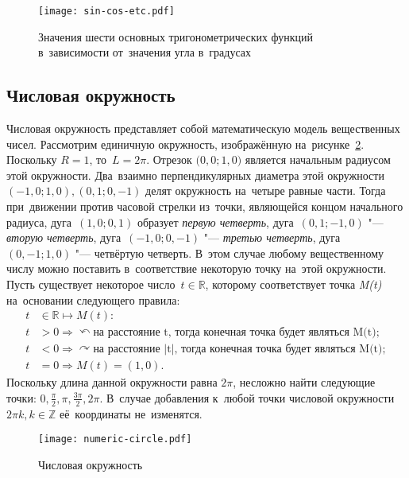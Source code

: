 \documentclass[]{scrartcl}
\begin{document}
\begin{figure}[ht]
	\centering %
	\texttt{[image: sin-cos-etc.pdf]}
	\caption{Значения шести основных тригонометрических функций в~зависимости от~значения угла в~градусах}\label{fig:sin-cos-etc}
\end{figure}
%
\subsection{Числовая окружность}
Числовая окружность представляет собой математическую модель вещественных чисел. Рассмотрим единичную окружность, изображённую на~рисунке~\ref{fig:numeric-circle}. Поскольку ${\textstyle R = 1}$, то~${\textstyle L = 2 \pi}$. Отрезок ${\textstyle (0,0; 1,0})$ является начальным радиусом этой окружности. Два~взаимно перпендикулярных диаметра этой окружности ${\textstyle (-1,0; 1,0), (0,1; 0,-1)}$ делят окружность на~четыре равные части. Тогда при~движении против часовой стрелки из~точки, являющейся концом начального радиуса, дуга~${\textstyle (1,0; 0,1)}$ образует \emph{первую четверть}, дуга~${\textstyle (0,1; -1,0)}$ "--- \emph{вторую четверть}, дуга~${\textstyle (-1,0; 0,-1)}$ "--- \emph{третью четверть}, дуга~${\textstyle (0,-1; 1,0)}$ "--- четвёртую четверть. В~этом случае любому вещественному числу можно поставить в~соответствие некоторую точку на~этой окружности. Пусть существует некоторое число~${\textstyle t \in \mathbb{R}}$, которому соответствует точка \textit{M(t)} на~основании следующего правила:
\begin{equation}\label{eq:numeric-circle}
	\begin{aligned}
	t& \in \mathbb{R} \mapsto M(t):\\
	t& > 0 \Rightarrow \curvearrowleft \text{на~расстояние t, тогда конечная точка будет являться M(t)};\\
	t& < 0 \Rightarrow \curvearrowright \text{на~расстояние |t|, тогда конечная точка будет являться M(t)};\\
	t& = 0 \Rightarrow M(t)=(1,0).
	\end{aligned}
\end{equation}
Поскольку длина данной окружности равна ${\textstyle 2 \pi}$, несложно найти следующие точки: ${\textstyle 0, \frac{\pi}{2}, \pi, \frac{3 \pi}{2}, 2 \pi}$. В~случае добавления к~любой точки числовой окружности ${\textstyle 2 \pi k, k \in \mathbb{Z}}$ её~координаты не~изменятся.
%
\begin{figure}[ht]
	\centering %
	\texttt{[image: numeric-circle.pdf]}
	\caption{Числовая окружность}\label{fig:numeric-circle}
\end{figure}
\end{document}
